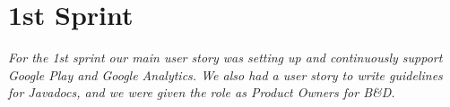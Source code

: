 \chapter{1st Sprint} \label{ChapSprint1}
\textit{For the 1st sprint our main user story was setting up and continuously support Google Play and Google Analytics. We also had a user story to write guidelines for Javadocs, and we were given the role as Product Owners for B\&D.}




